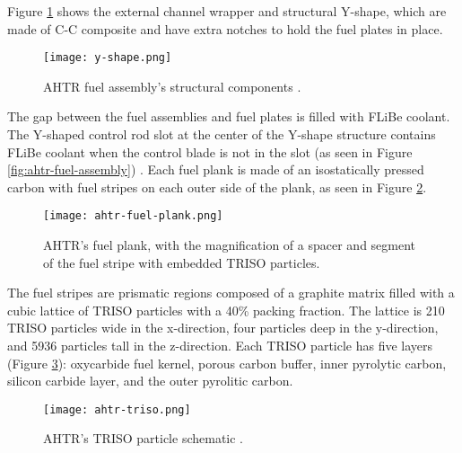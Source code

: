Figure \ref{fig:y-shape} shows the external channel wrapper and structural 
Y-shape, which are made of C-C composite and have extra notches to hold 
the fuel plates in place.
\begin{figure}[]
    \centering
    \texttt{[image: y-shape.png]} 
    \caption{\acrlong{AHTR} fuel assembly's structural components 
    \cite{noauthor_fluoride_nodate}.}
    \label{fig:y-shape}
\end{figure}
The gap between the fuel assemblies and fuel plates is filled with \gls{FLiBe}
coolant. 
The Y-shaped control rod slot at the center of the Y-shape structure contains 
\gls{FLiBe} coolant when the control blade is not in the slot (as seen in 
Figure \ref{fig:ahtr-fuel-assembly})
\cite{varma_ahtr_2012,ramey_monte_2018,noauthor_fluoride_nodate}.
Each fuel plank is made of an isostatically pressed carbon with fuel stripes 
on each outer side of the plank, as seen in Figure \ref{fig:ahtr-fuel-plank}. 
\begin{figure}[]
    \centering
    \texttt{[image: ahtr-fuel-plank.png]} 
    \caption{\acrlong{AHTR}'s fuel plank, with the magnification of 
    a spacer and segment of the fuel stripe with embedded TRISO particles.}
    \label{fig:ahtr-fuel-plank}
\end{figure}
The fuel stripes are prismatic regions composed of a graphite matrix filled with 
a cubic lattice of \gls{TRISO} particles with a 40\% packing fraction. 
The lattice is 210 \gls{TRISO} particles wide in the x-direction, four particles 
deep in the y-direction, and 5936 particles tall in the z-direction. 
Each \gls{TRISO} particle has five layers (Figure \ref{fig:ahtr-triso}): 
oxycarbide fuel kernel, porous carbon buffer, inner pyrolytic carbon, silicon 
carbide layer, and the outer pyrolitic carbon. 
\begin{figure}[]
    \centering
    \texttt{[image: ahtr-triso.png]} 
    \caption{\acrlong{AHTR}'s TRISO particle schematic \cite{noauthor_fluoride_nodate}.}
    \label{fig:ahtr-triso}
\end{figure}

